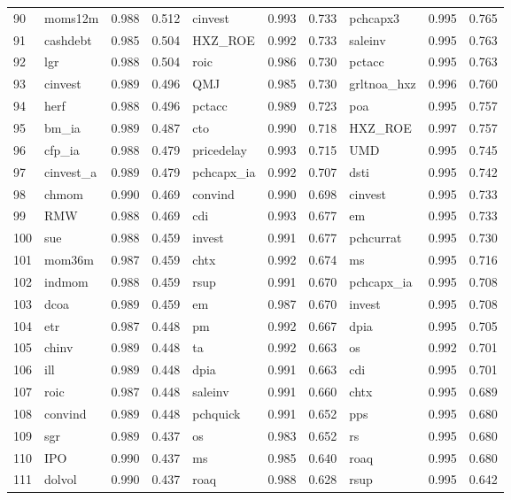 \begin{landscape}
\begin{footnotesize}
\begin{longtable}{l|lcc|lcc|lcc}
  90 & moms12m & 0.988 & 0.512 & cinvest & 0.993 & 0.733 & pchcapx3 & 0.995 & 0.765 \\ 
  91 & cashdebt & 0.985 & 0.504 & HXZ\_ROE & 0.992 & 0.733 & saleinv & 0.995 & 0.763 \\ 
  92 & lgr & 0.988 & 0.504 & roic & 0.986 & 0.730 & pctacc & 0.995 & 0.763 \\ 
  93 & cinvest & 0.989 & 0.496 & QMJ & 0.985 & 0.730 & grltnoa\_hxz & 0.996 & 0.760 \\ 
  94 & herf & 0.988 & 0.496 & pctacc & 0.989 & 0.723 & poa & 0.995 & 0.757 \\ 
  95 & bm\_ia & 0.989 & 0.487 & cto & 0.990 & 0.718 & HXZ\_ROE & 0.997 & 0.757 \\ 
  96 & cfp\_ia & 0.988 & 0.479 & pricedelay & 0.993 & 0.715 & UMD & 0.995 & 0.745 \\ 
  97 & cinvest\_a & 0.989 & 0.479 & pchcapx\_ia & 0.992 & 0.707 & dsti & 0.995 & 0.742 \\ 
  98 & chmom & 0.990 & 0.469 & convind & 0.990 & 0.698 & cinvest & 0.995 & 0.733 \\ 
  99 & RMW & 0.988 & 0.469 & cdi & 0.993 & 0.677 & em & 0.995 & 0.733 \\ 
  100 & sue & 0.988 & 0.459 & invest & 0.991 & 0.677 & pchcurrat & 0.995 & 0.730 \\ 
  101 & mom36m & 0.987 & 0.459 & chtx & 0.992 & 0.674 & ms & 0.995 & 0.716 \\ 
  102 & indmom & 0.988 & 0.459 & rsup & 0.991 & 0.670 & pchcapx\_ia & 0.995 & 0.708 \\ 
  103 & dcoa & 0.989 & 0.459 & em & 0.987 & 0.670 & invest & 0.995 & 0.708 \\ 
  104 & etr & 0.987 & 0.448 & pm & 0.992 & 0.667 & dpia & 0.995 & 0.705 \\ 
  105 & chinv & 0.989 & 0.448 & ta & 0.992 & 0.663 & os & 0.992 & 0.701 \\ 
  106 & ill & 0.989 & 0.448 & dpia & 0.991 & 0.663 & cdi & 0.995 & 0.701 \\ 
  107 & roic & 0.987 & 0.448 & saleinv & 0.991 & 0.660 & chtx & 0.995 & 0.689 \\ 
  108 & convind & 0.989 & 0.448 & pchquick & 0.991 & 0.652 & pps & 0.995 & 0.680 \\ 
  109 & sgr & 0.989 & 0.437 & os & 0.983 & 0.652 & rs & 0.995 & 0.680 \\ 
  110 & IPO & 0.990 & 0.437 & ms & 0.985 & 0.640 & roaq & 0.995 & 0.680 \\ 
  111 & dolvol & 0.990 & 0.437 & roaq & 0.988 & 0.628 & rsup & 0.995 & 0.642 \\ 

\end{longtable}
\end{footnotesize}
\end{landscape}
